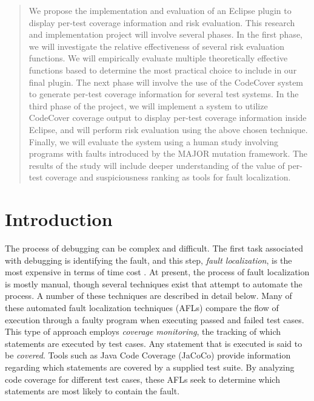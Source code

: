\documentclass[11pt]{article}
\begin{document}

\begin{quote}
  
	We propose the implementation and evaluation of an Eclipse plugin to
	display per-test coverage information and risk evaluation.  This
	research and implementation project will involve several phases.  In
	the first phase, we will investigate the relative effectiveness of
	several risk evaluation functions.  We will empirically evaluate 
	multiple theoretically effective functions based to determine the 
	most practical choice to include in our final plugin.  The next phase
	will involve the use of the CodeCover system to generate per-test 
	coverage information for several test systems.  In the third phase of
	the project, we will implement a system to utilize CodeCover coverage
	output to display per-test coverage information inside Eclipse, and will
	perform risk evaluation using the above chosen technique.  Finally, we
	will evaluate the system using a human study involving programs 
	with faults introduced by the MAJOR mutation framework.  The results 
	of the study will include deeper understanding of the value of per-test 
	coverage and suspiciousness ranking as tools for fault localization. 

\end{quote}

\section{Introduction}
\label{sec:introduction}
\vspace*{-.1in}


The process of debugging can be complex and difficult.  The first task
associated with debugging is identifying the fault, and this step,
\emph{fault localization}, is the most expensive in terms of time cost
\cite{harrold}. At present, the process of fault localization is mostly
manual, though several techniques exist that attempt to automate the
process.  A number of these techniques are described in detail below.
Many of these automated fault localization techniques (AFLs) compare the
flow of execution through a faulty program when executing passed and
failed test cases.  This type of approach employs \emph{coverage
monitoring}, the tracking of which statements are executed by test
cases.  Any statement that is executed is said to be \emph{covered}.
Tools such as Java Code Coverage (JaCoCo) \cite{jacoco} provide
information regarding which statements are covered by a supplied test
suite.  By analyzing code coverage for different test cases, these AFLs
seek to determine which statements are most likely to contain the fault.
\end{document}
